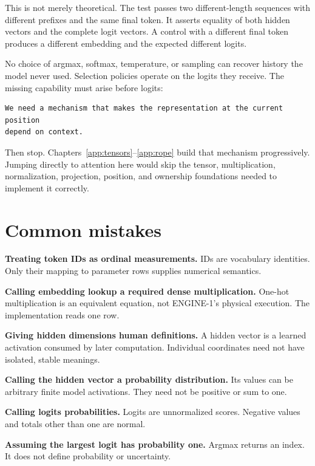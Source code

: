 This is not merely theoretical. The test
\texttt{}
passes two different-length sequences with different prefixes and the
same final token. It asserts equality of both hidden vectors and the
complete logit vectors. A control with a different final token produces
a different embedding and the expected different logits.

No choice of argmax, softmax, temperature, or sampling can recover
history the model never used. Selection policies operate on the logits
they receive. The missing capability must arise before logits:

\begin{verbatim}
We need a mechanism that makes the representation at the current position
depend on context.
\end{verbatim}

Then stop. Chapters~\ref{app:tensors}--\ref{app:rope} build that mechanism progressively. Jumping
directly to attention here would skip the tensor, multiplication,
normalization, projection, position, and ownership foundations needed to
implement it correctly.

\section{Common mistakes}\label{common-mistakes-2}

\textbf{Treating token IDs as ordinal measurements.} IDs are vocabulary
identities. Only their mapping to parameter rows supplies numerical
semantics.

\textbf{Calling embedding lookup a required dense multiplication.}
One-hot multiplication is an equivalent equation, not ENGINE-1's
physical execution. The implementation reads one row.

\textbf{Giving hidden dimensions human definitions.} A hidden vector is
a learned activation consumed by later computation. Individual
coordinates need not have isolated, stable meanings.

\textbf{Calling the hidden vector a probability distribution.} Its
values can be arbitrary finite model activations. They need not be
positive or sum to one.

\textbf{Calling logits probabilities.} Logits are unnormalized scores.
Negative values and totals other than one are normal.

\textbf{Assuming the largest logit has probability one.} Argmax returns
an index. It does not define probability or uncertainty.


